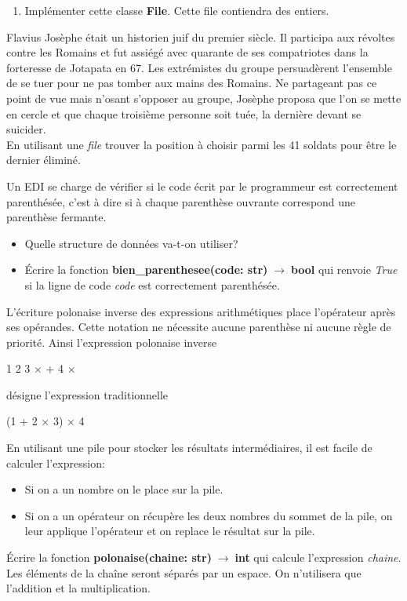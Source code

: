 \documentclass[a4paper,11pt]{article}
\begin{document}
\begin{Form}
\begin{exo}
\begin{enumerate}
\item Implémenter cette classe \textbf{File}. Cette file contiendra des entiers.
\end{enumerate}
\end{exo}
\begin{exo}
Flavius Josèphe était un historien juif du premier siècle. Il participa aux révoltes contre les Romains et fut assiégé avec quarante de ses compatriotes dans la forteresse de Jotapata en 67. Les  extrémistes  du  groupe  persuadèrent l’ensemble de se tuer pour ne pas  tomber  aux  mains  des  Romains.  Ne partageant  pas  ce  point  de  vue  mais  n’osant  s’opposer  au groupe,  Josèphe  proposa  que  l’on  se  mette  en  cercle  et  que  chaque  troisième  personne  soit  tuée,  la  dernière devant  se  suicider.\\
En utilisant une \emph{file} trouver la position à choisir parmi les 41 soldats pour être le dernier éliminé.
\end{exo}
\begin{exo}
Un EDI se charge de vérifier si le code écrit par le programmeur est correctement parenthésée, c'est à dire si à chaque parenthèse ouvrante correspond une parenthèse fermante.
\begin{itemize}
\item Quelle structure de données va-t-on utiliser?
\item Écrire la fonction \textbf{bien\_parenthesee(code: str)$\;\rightarrow\;$bool} qui renvoie \emph{True} si la ligne de code \emph{code} est correctement parenthésée.
\end{itemize}
\end{exo}
\begin{exo}
L'écriture polonaise inverse des expressions arithmétiques place l'opérateur après ses opérandes. Cette notation ne nécessite aucune parenthèse ni aucune règle de priorité. Ainsi l'expression polonaise inverse 
\begin{center}
1 2 3 × + 4 ×
\end{center}
désigne l'expression traditionnelle
\begin{center}
(1 + 2 × 3) × 4
\end{center}
En utilisant une pile pour stocker les résultats intermédiaires, il est facile de calculer l'expression:
\begin{itemize}
\item Si on a un nombre on le place sur la pile.
\item Si on a un opérateur on récupère les deux nombres du sommet de la pile, on leur applique l'opérateur et on replace le résultat sur la pile.
\end{itemize}
Écrire la fonction \textbf{polonaise(chaine: str)$\;\rightarrow\;$int} qui calcule l'expression \emph{chaine}. Les éléments de la chaîne seront séparés par un espace. On n'utilisera que l'addition et la multiplication.
\end{exo}
\end{Form}
\end{document}
